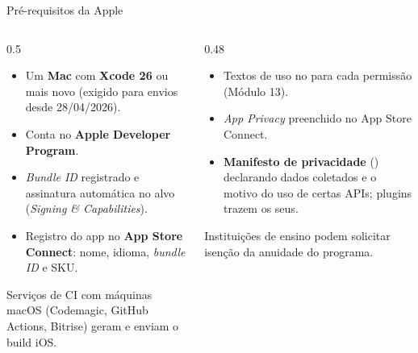 \documentclass[aspectratio=169,10pt]{beamer}
\begin{document}
\begin{frame}{Pré-requisitos da Apple}
  \begin{columns}[T]
    \begin{column}{0.5\textwidth}
      \begin{conceito}
        \begin{itemize}
          \item Um \textbf{Mac} com \textbf{Xcode 26} ou mais novo (exigido para envios desde 28/04/2026).
          \item Conta no \textbf{Apple Developer Program}.
          \item \emph{Bundle ID} registrado e assinatura automática no alvo  (\emph{Signing \& Capabilities}).
          \item Registro do app no \textbf{App Store Connect}: nome, idioma, \emph{bundle ID} e SKU.
        \end{itemize}
      \end{conceito}
      \begin{dica}
        Serviços de CI com máquinas macOS (Codemagic, GitHub Actions, Bitrise) geram e enviam o build iOS.
      \end{dica}
    \end{column}
    \begin{column}{0.48\textwidth}
      \begin{conceito}
        \begin{itemize}
          \item Textos de uso no  para cada permissão (Módulo 13).
          \item \emph{App Privacy} preenchido no App Store Connect.
          \item \textbf{Manifesto de privacidade} () declarando dados coletados e o motivo do uso de certas APIs; plugins trazem os seus.
        \end{itemize}
      \end{conceito}
      \begin{dica}[Instituições]
        Instituições de ensino podem solicitar isenção da anuidade do programa.
      \end{dica}
    \end{column}
  \end{columns}
\end{frame}
\end{document}
